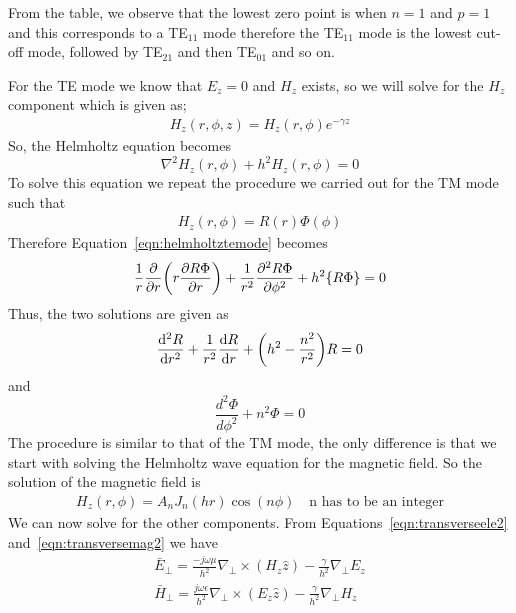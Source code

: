 From the table, we observe that the lowest zero point is when $n = 1$ and $p = 1$ and this corresponds to a TE$_{11}$ mode therefore the TE$_{11}$ mode is the lowest cut-off mode, followed by TE$_{21}$ and then TE$_{01}$ and so on.

For the TE mode we know that $E_z = 0$ and $H_z$ exists, so we will solve for the $H_z$  component which is given as;
\begin{align*}
H_z(r,\phi,z) = H_z(r,\phi)e^{-\gamma z}
\end{align*}
So, the Helmholtz equation becomes
\begin{equation}
\nabla^2 H_z(r,\phi) + h^2 H_z(r,\phi) = 0
\label{eqn:helmholtztemode}
\end{equation}
To solve this equation we repeat the procedure we carried out for the TM mode such that 
\begin{align*}
H_z(r,\phi)= R(r)\Phi(\phi)
\end{align*}
Therefore Equation~\eqref{eqn:helmholtztemode} becomes
\begin{align*}
\frac{1}{r}\partialderivative{}{r}\bigg(r\partialderivative{R\Phi}{r}\bigg) + \frac{1}{r^2}\partialderivative[2]{R\Phi}{\phi} + h^2\{R\Phi\} = 0
\end{align*}
Thus, the two solutions are given as
\begin{equation}
\derivative[2]{R}{r} + \frac{1}{r^2}\derivative{R}{r} + \bigg(h^2 - \frac{n^2}{r^2}\bigg)R = 0
\label{eqn:radialtemode}
\end{equation}
and 
\begin{equation}
\dfrac{d^2\Phi}{d\phi^2} + n^2\Phi = 0
\label{eqn:angulartemode}
\end{equation}
The procedure is similar to that of the TM mode, the only difference is that we start with solving the Helmholtz wave equation for the magnetic field. So the solution of the magnetic field is 
\begin{align*}
H_z(r,\phi) = A_nJ_n(hr)\cos(n\phi)\quad\text{n has to be an integer}
\end{align*}
We can now solve for the other components. From Equations~\eqref{eqn:transverseele2} and~\eqref{eqn:transversemag2} we have
\begin{align*}
\bar{E}_\perp = \frac{-j\omega\mu}{h^2}\nabla_\perp\times(H_z\hat{z}) - \frac{\gamma}{h^2}\nabla_\perp E_z\\
\bar{H}_\perp = \frac{j\omega\epsilon}{h^2}\nabla_\perp\times(E_z\hat{z}) - \frac{\gamma}{h^2}\nabla_\perp H_z
\end{align*}

